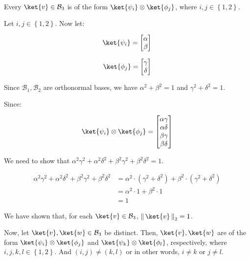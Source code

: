 \documentclass{article}
\newcommand{\norm}[1]{\left\|\,#1\,\right\|}       %
\newcommand{\enorm}[1]{\norm{#1}_{\mathrm{2}}}      %
\newcommand{\set}[1]{{\left\{#1\right\}}}    %
\begin{document}
\begin{enumerate}
\begin{enumerate}
                Every $\ket{v}\in\mathcal{B}_3$ is of the form $\ket{\psi_i}\otimes\ket{\phi_j}$, where $i,j\in\set{1,2}$.

                Let $i,j\in\set{1,2}$. Now let:

                $$\ket{\psi_i}=\begin{bmatrix}
                    \alpha \\
                    \beta  \\
                  \end{bmatrix}$$

                $$\ket{\phi_j}=\begin{bmatrix}
                    \gamma \\
                    \delta \\
                  \end{bmatrix}$$

                Since $\mathcal{B}_1,\mathcal{B}_2$ are orthonormal bases, we have $\alpha^2+\beta^2=1$ and $\gamma^2+\delta^2=1$.

                Since:

                $$\ket{\psi_i}\otimes\ket{\phi_j}=\begin{bmatrix}
                    \alpha\gamma \\
                    \alpha\delta \\
                    \beta\gamma  \\
                    \beta\delta  \\
                  \end{bmatrix}$$

                We need to show that $\alpha^2\gamma^2+\alpha^2\delta^2+\beta^2\gamma^2+\beta^2\delta^2=1$.

                $$\begin{aligned}
                    \alpha^2\gamma^2+\alpha^2\delta^2+\beta^2\gamma^2+\beta^2\delta^2
                     & = \alpha^2\cdot(\gamma^2+\delta^2)+\beta^2\cdot(\gamma^2+\delta^2) \\
                     & = \alpha^2\cdot 1+\beta^2\cdot 1                                   \\
                     & = 1
                  \end{aligned}$$

                We have shown that, for each $\ket{v}\in\mathcal{B}_3$, $\enorm{\ket{v}}=1$.

                Now, let $\ket{v},\ket{w}\in\mathcal{B}_3$ be distinct.
                Then, $\ket{v},\ket{w}$ are of the form $\ket{\psi_i}\otimes\ket{\phi_j}$ and $\ket{\psi_k}\otimes\ket{\phi_l}$, respectively, where $i,j,k,l\in\set{1,2}$.
                And $(i,j)\neq(k,l)$ or in other words, $i\neq k$ or $j\neq l$.


\end{enumerate}
\end{enumerate}
\end{document}
